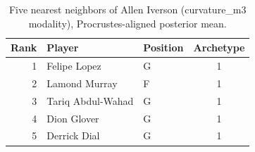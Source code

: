 \begin{table}[htbp]
  \centering\small
  \begin{tabular}{rllc}
    \toprule
    Rank & Player & Position & Archetype \\
    \midrule
    1 & Felipe Lopez & G & 1 \\
    2 & Lamond Murray & F & 1 \\
    3 & Tariq Abdul-Wahad & G & 1 \\
    4 & Dion Glover & G & 1 \\
    5 & Derrick Dial & G & 1 \\
    \bottomrule
  \end{tabular}
  \caption{Five nearest neighbors of Allen Iverson (curvature_m3 modality), Procrustes-aligned posterior mean.}
  \label{tab:Allen_Iverson_neighbors_curvature_m3}
\end{table}


